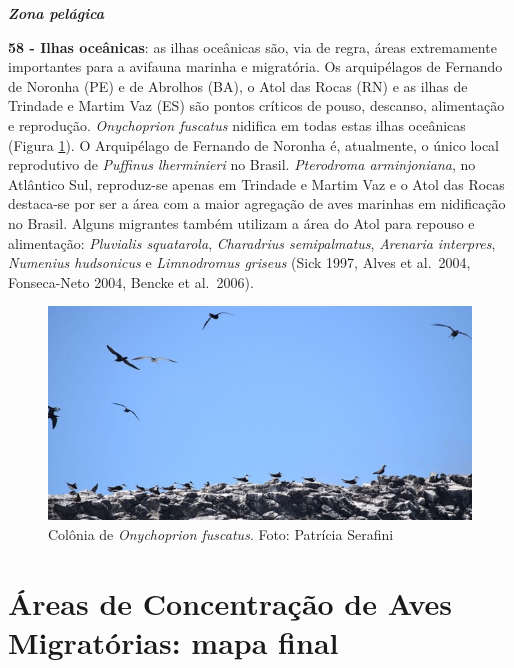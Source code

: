 \documentclass[
  oneside]{scrbook}
\begin{document}
\textbf{\emph{Zona pelágica}}

\textbf{58 - Ilhas oceânicas}: as ilhas oceânicas são, via de regra, áreas extremamente importantes para a avifauna marinha e migratória. Os arquipélagos de Fernando de Noronha (PE) e de Abrolhos (BA), o Atol das Rocas (RN) e as ilhas de Trindade e Martim Vaz (ES) são pontos críticos de pouso, descanso, alimentação e reprodução. \emph{Onychoprion fuscatus} nidifica em todas estas ilhas oceânicas (Figura \ref{fig:29}). O Arquipélago de Fernando de Noronha é, atualmente, o único local reprodutivo de \emph{Puffinus lherminieri} no Brasil. \emph{Pterodroma arminjoniana}, no Atlântico Sul, reproduz-se apenas em Trindade e Martim Vaz e o Atol das Rocas destaca-se por ser a área com a maior agregação de aves marinhas em nidificação no Brasil. Alguns migrantes também utilizam a área do Atol para repouso e alimentação: \emph{Pluvialis squatarola}, \emph{Charadrius semipalmatus}, \emph{Arenaria interpres}, \emph{Numenius hudsonicus} e \emph{Limnodromus griseus} (Sick 1997, Alves et al.~2004, Fonseca-Neto 2004, Bencke et al.~2006).

\begin{figure}[H]

{\centering \includegraphics[width=0.75\linewidth]{imagens/cap07/Figura_7.9} 

}

\caption{Colônia de \emph{Onychoprion fuscatus}. Foto: Patrícia Serafini}\label{fig:29}
\end{figure}



\newpage

\hypertarget{uxe1reas-de-concentrauxe7uxe3o-de-aves-migratuxf3rias-mapa-final}{%
\section{Áreas de Concentração de Aves Migratórias: mapa final}\label{uxe1reas-de-concentrauxe7uxe3o-de-aves-migratuxf3rias-mapa-final}}
\end{document}
